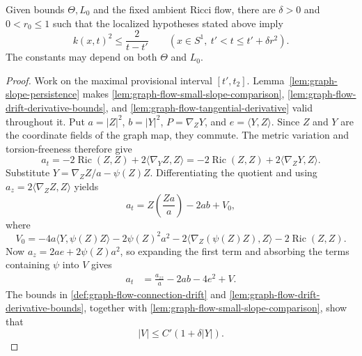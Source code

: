 \begin{theorem}
\label{thm:short-time-curve-curvature-barrier}
\notready
Given bounds $\Theta,L_0$ and the fixed ambient Ricci flow, there are
$\delta>0$ and $0<r_0\le1$ such that the localized hypotheses stated above
imply
\[
 k(x,t)^2\le\frac2{t-t'}
 \qquad(x\in S^1,\ t'<t\le t'+\delta r^2).
\]
The constants may depend on both $\Theta$ and $L_0$.
\end{theorem}
\begin{proof}
Work on the maximal provisional interval $[t',t_2]$.
Lemma~\ref{lem:graph-slope-persistence} makes
\ref{lem:graph-flow-small-slope-comparison},
\ref{lem:graph-flow-drift-derivative-bounds}, and
\ref{lem:graph-flow-tangential-derivative} valid throughout it.  Put
$a=|Z|^2$, $b=|Y|^2$, $P=\nabla_ZY$, and $e=\langle Y,Z\rangle$.  Since
$Z$ and $Y$ are the coordinate fields of the graph map, they commute.  The
metric variation and torsion-freeness therefore give
\[
 a_t=-2\operatorname{Ric}(Z,Z)+2\langle\nabla_YZ,Z\rangle
     =-2\operatorname{Ric}(Z,Z)+2\langle\nabla_ZY,Z\rangle.
\]
Substitute $Y=\nabla_ZZ/a-\psi(Z)Z$.  Differentiating the quotient and
using $a_z=2\langle\nabla_ZZ,Z\rangle$ yields
\[
 a_t=Z\left(\frac{Za}{a}\right)-2ab+V_0,
\]
where
\[
 V_0=-4a\langle Y,\psi(Z)Z\rangle-2\psi(Z)^2a^2
 -2\langle\nabla_Z(\psi(Z)Z),Z\rangle-2\operatorname{Ric}(Z,Z).
\]
Now $a_z=2ae+2\psi(Z)a^2$, so expanding the first term and absorbing the
terms containing $\psi$ into $V$ gives
\begin{align*}
 a_t&=\frac{a_{zz}}a-2ab-4e^2+V.                    \tag{1}
\end{align*}
The bounds in \ref{def:graph-flow-connection-drift} and
\ref{lem:graph-flow-drift-derivative-bounds}, together with
\ref{lem:graph-flow-small-slope-comparison}, show that
\[
 |V|\le C'(1+\delta|Y|).                            \tag{2}
\]


\end{proof}

